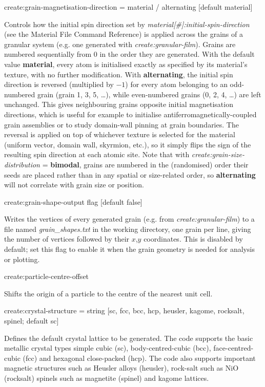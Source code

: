 {\zicf create:grain-magnetisation-direction = material / alternating [default material]} Controls how the initial spin direction set by \textit{material[\#]:initial-spin-direction} (see the Material File Command Reference) is applied across the grains of a granular system (e.g. one generated with \textit{create:granular-film}). Grains are numbered sequentially from 0 in the order they are generated. With the default value \textbf{material}, every atom is initialised exactly as specified by its material's texture, with no further modification. With \textbf{alternating}, the initial spin direction is reversed (multiplied by $-1$) for every atom belonging to an odd-numbered grain (grain 1, 3, 5, \ldots), while even-numbered grains (0, 2, 4, \ldots) are left unchanged. This gives neighbouring grains opposite initial magnetisation directions, which is useful for example to initialise antiferromagnetically-coupled grain assemblies or to study domain-wall pinning at grain boundaries. The reversal is applied on top of whichever texture is selected for the material (uniform vector, domain wall, skyrmion, etc.), so it simply flips the sign of the resulting spin direction at each atomic site. Note that with \textit{create:grain-size-distribution} = \textbf{bimodal}, grains are numbered in the (randomised) order their seeds are placed rather than in any spatial or size-related order, so \textbf{alternating} will not correlate with grain size or position.

{\zicf create:grain-shape-output flag [default false]} Writes the vertices of every generated grain (e.g. from \textit{create:granular-film}) to a file named \textit{grain\_shapes.txt} in the working directory, one grain per line, giving the number of vertices followed by their $x$,$y$ coordinates. This is disabled by default; set this flag to enable it when the grain geometry is needed for analysis or plotting.

{\zicf create:particle-centre-offset} Shifts the origin of a particle to the centre of the nearest unit cell.

{\zicf create:crystal-structure = string [sc, fcc, bcc, hcp, heusler, kagome, rocksalt, spinel; default sc]} Defines the default crystal lattice to be generated. The code supports the basic metallic crystal types simple cubic (sc), body-centred-cubic (bcc), face-centred-cubic (fcc) and hexagonal close-packed (hcp). The code also supports important magnetic structures such as Heusler alloys (heusler), rock-salt such as NiO (rocksalt) spinels such as magnetite (spinel) and kagome lattices.

